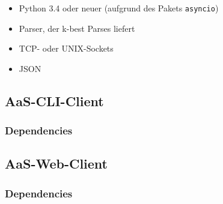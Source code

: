 \documentclass{scrartcl}
\begin{document}
    \begin{itemize}
            \vspace{10pt}
        \item Python 3.4 oder neuer (aufgrund des Pakets \texttt{asyncio})
            \vspace{10pt}
        \item Parser, der k-best Parses liefert
            \vspace{10pt}
        \item TCP- oder UNIX-Sockets
        	\vspace{10pt}
        \item JSON
    \end{itemize}

\subsection{AaS-CLI-Client}
\label{sub:AaS-CLI-Client}

\subsubsection{Dependencies}
\label{ssub:CLI-Client-Dependencies}

\subsection{AaS-Web-Client}
\label{sub:AaS-Web-Client}

\subsubsection{Dependencies}
\label{ssub:Web-Client-Dependencies}
\end{document}
